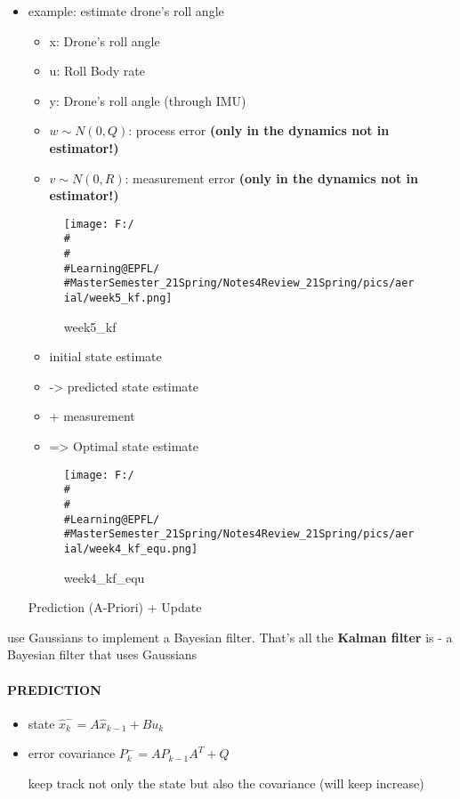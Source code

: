 \documentclass[]{article}
\let\oldparagraph\paragraph
\renewcommand{\paragraph}[1]{\oldparagraph{#1}\mbox{}}
\begin{document}
\begin{itemize}
\item
  example: estimate drone's roll angle

  \begin{itemize}
  \item
    x: Drone's roll angle
  \item
    u: Roll Body rate
  \item
    y: Drone's roll angle (through IMU)
  \item
    \(w \sim N (0, Q)\): process error \textbf{(only in the dynamics not
    in estimator!)}
  \item
    \(v \sim N (0, R)\): measurement error \textbf{(only in the dynamics
    not in estimator!)}
  \end{itemize}

  \begin{figure}
  \centering
  \texttt{[image: F:/\\\#\\\#\\\#Learning@EPFL/\\\#MasterSemester\_21Spring/Notes4Review\_21Spring/pics/aerial/week5\_kf.png]}
  \caption{week5\_kf}
  \end{figure}

  \begin{itemize}
  \item
    initial state estimate
  \item
    -\textgreater{} predicted state estimate
  \item
    + measurement
  \item
    =\textgreater{} Optimal state estimate
  \end{itemize}

  \begin{figure}
  \centering
  \texttt{[image: F:/\\\#\\\#\\\#Learning@EPFL/\\\#MasterSemester\_21Spring/Notes4Review\_21Spring/pics/aerial/week4\_kf\_equ.png]}
  \caption{week4\_kf\_equ}
  \end{figure}

  Prediction (A-Priori) + Update
\end{itemize}

use Gaussians to implement a Bayesian filter. That's all the
\textbf{Kalman filter} is - a Bayesian filter that uses Gaussians

\paragraph{PREDICTION}\label{header-n943}

\begin{itemize}
\item
  state \(\hat{x}_{k}^{-}=A \hat{x}_{k-1}+B u_{k}\)
\item
  error covariance \(P_{k}^{-}=A P_{k-1} A^{T}+Q\)

  keep track not only the state but also the covariance (will keep
  increase)
\end{itemize}
\end{document}
